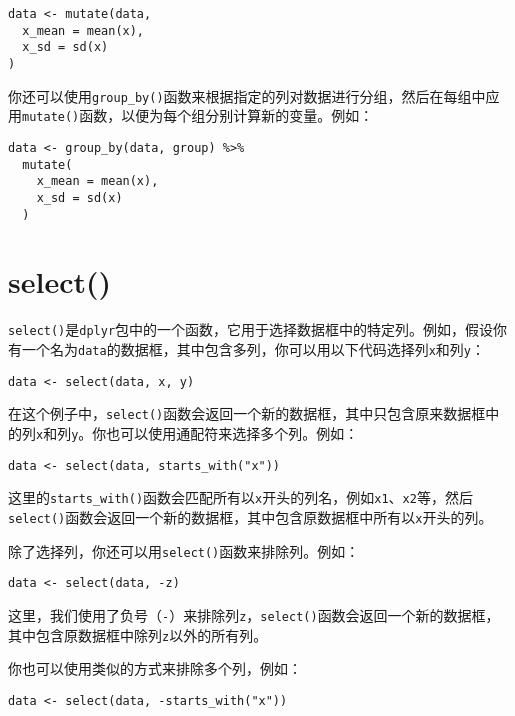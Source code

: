 \documentclass[
  letterpaper,
  DIV=11,
  numbers=noendperiod]{scrreprt}
\begin{document}
\begin{verbatim}
data <- mutate(data,
  x_mean = mean(x),
  x_sd = sd(x)
)
\end{verbatim}

你还可以使用\texttt{group\_by()}函数来根据指定的列对数据进行分组，然后在每组中应用\texttt{mutate()}函数，以便为每个组分别计算新的变量。例如：

\begin{verbatim}
data <- group_by(data, group) %>%
  mutate(
    x_mean = mean(x),
    x_sd = sd(x)
  )
\end{verbatim}

\hypertarget{select}{%
\section{select()}\label{select}}

\texttt{select()}是\texttt{dplyr}包中的一个函数，它用于选择数据框中的特定列。例如，假设你有一个名为\texttt{data}的数据框，其中包含多列，你可以用以下代码选择列\texttt{x}和列\texttt{y}：

\begin{verbatim}
data <- select(data, x, y)
\end{verbatim}

在这个例子中，\texttt{select()}函数会返回一个新的数据框，其中只包含原来数据框中的列\texttt{x}和列\texttt{y}。你也可以使用通配符来选择多个列。例如：

\begin{verbatim}
data <- select(data, starts_with("x"))
\end{verbatim}

这里的\texttt{starts\_with()}函数会匹配所有以\texttt{x}开头的列名，例如\texttt{x1}、\texttt{x2}等，然后\texttt{select()}函数会返回一个新的数据框，其中包含原数据框中所有以\texttt{x}开头的列。

除了选择列，你还可以用\texttt{select()}函数来排除列。例如：

\begin{verbatim}
data <- select(data, -z)
\end{verbatim}

这里，我们使用了负号（\texttt{-}）来排除列\texttt{z}，\texttt{select()}函数会返回一个新的数据框，其中包含原数据框中除列\texttt{z}以外的所有列。

你也可以使用类似的方式来排除多个列，例如：

\begin{verbatim}
data <- select(data, -starts_with("x"))
\end{verbatim}
\end{document}
